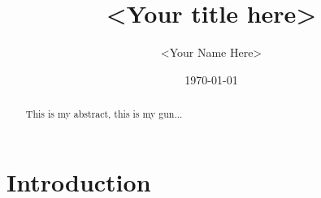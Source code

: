 \documentclass[cmpstyle]{report}
\begin{document}
    \title{<Your title here>}
    \author{<Your Name Here>}
    \date{\today}
    \maketitle
    
    \begin{abstract}
        This is my abstract, this is my gun...
    \end{abstract}

\section{Introduction}



\end{document}
